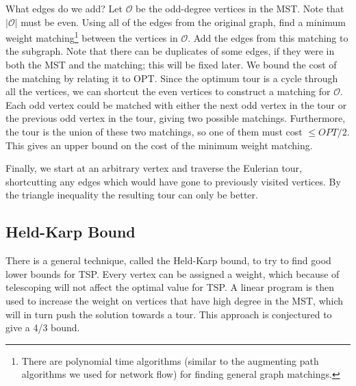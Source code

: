 \documentclass{article}
\begin{document}
What edges do we add? Let $\mathcal{O}$ be the odd-degree vertices in
the MST. Note that $|\mathcal{O}|$ must be even. Using all of the
edges from the original graph, find a minimum weight
matching\footnote{There are polynomial time algorithms (similar to the
augmenting path algorithms we used for network flow) for finding
general graph matchings.} between the vertices in $\mathcal{O}$. Add
the edges from this matching to the subgraph. Note that there can be
duplicates of some edges, if they were in both the MST and the
matching; this will be fixed later. We bound the cost of the matching
by relating it to OPT. Since the optimum tour is a cycle through all
the vertices, we can shortcut the even vertices to construct a
matching for $\mathcal{O}$. Each odd vertex could be matched
with either the next odd vertex in the tour or the previous odd vertex
in the tour, giving two possible matchings. Furthermore, the
tour is the union of these two matchings, so one of them must cost $\le
OPT/2$. This gives an upper bound on the cost of the minimum weight
matching.

Finally, we start at an arbitrary vertex and traverse the Eulerian
tour, shortcutting any edges which would have gone to previously
visited vertices. By the triangle inequality the resulting tour can
only be better.


\subsection{Held-Karp Bound}

There is a general technique, called the Held-Karp bound, to try to
find good lower bounds for TSP. Every vertex can be assigned a weight,
which because of telescoping will not affect the optimal value for
TSP. A linear program is then used to increase the weight on vertices
that have high degree in the MST, which will in turn push the solution
towards a tour. This approach is conjectured to give a 4/3 bound.
\end{document}
